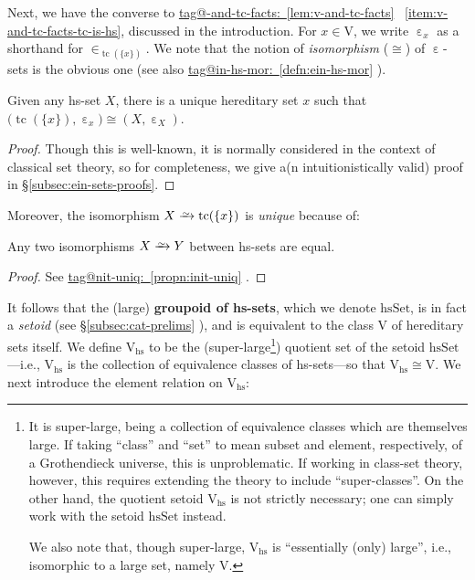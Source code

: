 \documentclass{amsart}
\makeatletter
\newcommand\defword[1]{{\boldmath \textbf{#1}}}
\newcommand\ein{\mathrel{\varepsilon}}
\newcommand\hsSet{\mathrm{hsSet}}
\newcommand\hs{\mathrm{hs}}
\newcommand\pbig[1]{\big({#1}\big)}
\newcommand\rV{\mathrm{V}}
\newcommand\set[2][]{#1\{ #2 #1\}}
\newcommand\tc{\operatorname{tc}}
\newcommand\toi{\xrightarrow{\raisebox{-2.5pt}[0pt][0pt]{\ensuremath{\scriptstyle{\sim}}}}}
\newcommand\unein{{\ein}}
\newcommand\unin{{\in}}
\newcommand\tagword[1]{\csname tag@#1\endcsname}
\def\label@tag#1:#2\@nil{#1}
\newcommand\labeltag[1]{\label@tag#1:\@nil}
\newcommand\jref[1]{%
  \texorpdfstring%
    {\hyperref[#1]{\tagword{\labeltag{#1}}~\ref*{#1}}}%
    {\tagword{\labeltag{#1}}~\ref*{#1}}%
}
\newcommand\prerefpost[3]{%
  \texorpdfstring%
    {\hyperref[#2]{#1\ref*{#2}#3}}%
    {#1\ref*{#2}#3}%
}
\newcommand\sref[1]{\prerefpost{\S}{#1}{}}
\theoremstyle{definition}
\theoremstyle{remark}
\theoremstyle{plainwithref}
\newenvironment{settybox}{\begin{tcolorbox}[colback=blue!20,breakable%
    ,enhanced%
    ,sharp corners%
    ,frame hidden%
    ,boxsep=0pt
    ,left=5pt,right=5pt,top=5pt,bottom=5pt
    ,enlarge left by=-5pt,width=\linewidth+10pt
    ,enlarge top by=5pt,enlarge bottom by=5pt
    ,before skip balanced=0pt,after skip balanced=0pt
    ]}{\end{tcolorbox}}
\makeatother
\begin{document}
Next, we have the converse to \jref{lem:v-and-tc-facts}~\ref{item:v-and-tc-facts-tc-is-hs}, discussed in the introduction.
For \( x \in \rV \), we write \( \unein_x \) as a shorthand for \( \unin_{\tc(\set{x})} \).
We note that the notion of \emph{isomorphism} (\( \cong \)) of \( \unein \)-sets is the obvious one (see also \jref{defn:ein-hs-mor}).
\begin{settybox}
  \begin{propn} \label{propn:mostowski-collapse}
    Given any hs-set \( X \), there is a unique hereditary set \( x \) such that \( \pbig{\tc(\set{x}), \ein_x} \cong (X, \ein_X) \).
  \end{propn}

  \begin{proof}
    Though this is well-known, it is normally considered in the context of classical set theory, so for completeness, we give a(n intuitionistically valid) proof in \hyperref[proof:mostowski-collapse]{\S\ref*{subsec:ein-sets-proofs}}.
  \end{proof}
\end{settybox}

\noindent
Moreover, the isomorphism \( X \toi \tc(\set{x}) \) is \emph{unique} because of:
\begin{settybox}
  \begin{propn}
    Any two isomorphisms \( X \toi Y \) between hs-sets are equal.
  \end{propn}

  \begin{proof}
    See \jref{propn:init-uniq}.
  \end{proof}
\end{settybox}
It follows that the (large) \defword{groupoid of hs-sets}, which we denote
\defword{\( \hsSet \)}, is in fact a \emph{setoid} (see \sref{subsec:cat-prelims}), and is equivalent to the class \( \rV \) of hereditary sets itself.
We define \( \rV_{\hs} \) to be the (super-large\footnote{%
  \label{footnote:super-large}
  It is super-large, being a collection of equivalence classes which are themselves large.
  If taking ``class'' and ``set'' to mean subset and element, respectively, of a Grothendieck universe, this is unproblematic.
  If working in class-set theory, however, this requires extending the theory to include ``super-classes''.
  On the other hand, the quotient setoid \( \rV_\hs \) is not strictly necessary; one can simply work with the setoid \( \hsSet \) instead.

  We also note that, though super-large, \( \rV_\hs \) is ``essentially (only) large'', i.e., isomorphic to a large set, namely \( \rV \).
})
quotient set of the setoid \( \hsSet \)---i.e., \( \rV_{\hs} \) is the collection of equivalence classes of hs-sets---so that \( \rV_{\hs} \cong \rV \).
We next introduce the element relation on \( \rV_\hs \):
\end{document}
